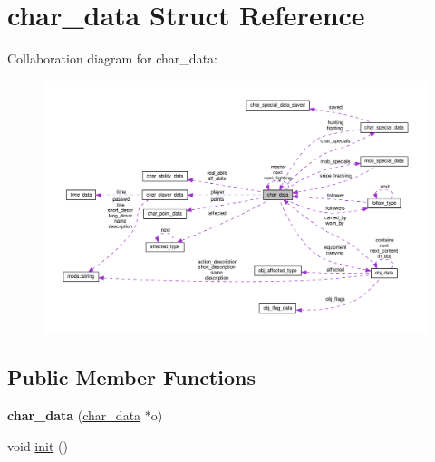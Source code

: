 \hypertarget{structchar__data}{}\section{char\+\_\+data Struct Reference}
\label{structchar__data}


Collaboration diagram for char\+\_\+data\+:
\nopagebreak
\begin{figure}[H]
\begin{center}
\leavevmode
\includegraphics[width=350pt]{structchar__data__coll__graph}
\end{center}
\end{figure}
\subsection*{Public Member Functions}
\begin{DoxyCompactItemize}
\item 
\mbox{\label{structchar__data_ae60aa6a7542b7417e550731fe2282868}} 
{\bfseries char\+\_\+data} (\hyperlink{structchar__data}{char\+\_\+data} $\ast$o)
\item 
void \hyperlink{structchar__data_ac08c59f455b01ef91858398b98c708fc}{init} ()
\end{DoxyCompactItemize}
